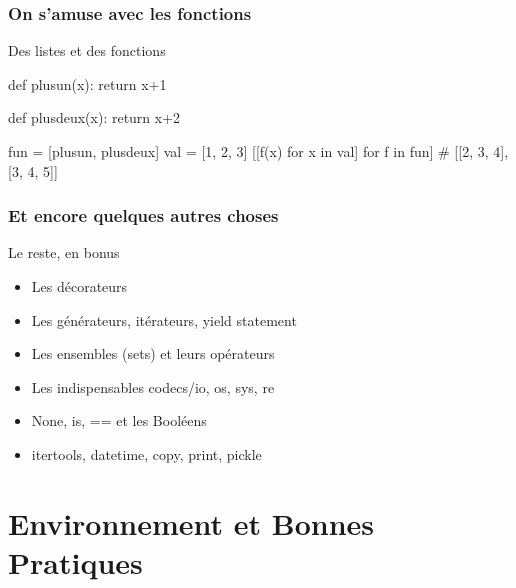 \documentclass{beamer}
\begin{document}
\begin{frame}[fragile]
  \frametitle{On s'amuse avec les fonctions}

  \begin{block}{Des listes et des fonctions}
    \begin{python}
def plusun(x):
  return x+1

def plusdeux(x):
  return x+2

fun = [plusun, plusdeux]
val = [1, 2, 3]
[[f(x) for x in val] for f in fun]
# [[2, 3, 4], [3, 4, 5]]
    \end{python}
  \end{block}
\end{frame}

\begin{frame}
  \frametitle{Et encore quelques autres choses}

  \begin{block}{Le reste, en bonus}
    \begin{itemize}
    \item Les décorateurs
    \item Les générateurs, itérateurs, yield statement
    \item Les ensembles (sets) et leurs opérateurs
    \item Les indispensables codecs/io, os, sys, re
    \item None, is, == et les Booléens
    \item itertools, datetime, copy, print, pickle
    \end{itemize}
  \end{block}
\end{frame}

\section{Environnement et Bonnes Pratiques}
\label{sec:environment}
\end{document}
